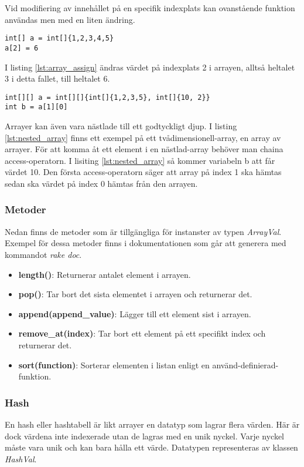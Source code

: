 \documentclass{TDP003mall}
\begin{document}
Vid modifiering av innehållet på en specifik indexplats kan ovanstående funktion användas men med en liten ändring.
\begin{lstlisting}[caption=Ändra värden i en array, label=lst:array_assign]
int[] a = int[]{1,2,3,4,5}
a[2] = 6
\end{lstlisting}
I listing \ref{lst:array_assign} ändras värdet på indexplats 2 i arrayen, alltså heltalet 3 i detta fallet, till heltalet 6.

\begin{lstlisting}[caption=Nästlad-array, label=lst:nested_array]
int[][] a = int[][]{int[]{1,2,3,5}, int[]{10, 2}}
int b = a[1][0]
\end{lstlisting}
Arrayer kan även vara nästlade till ett godtyckligt djup. I listing \ref{lst:nested_array} finns ett exempel på ett tvådimensionell-array, en array av arrayer.
För att komma åt ett element i en nästlad-array behöver man chaina access-operatorn. 
I lisiting \ref{lst:nested_array} så kommer variabeln b att får värdet 10.
Den första access-operatorn säger att array på index 1 ska hämtas sedan ska värdet på index 0 hämtas från den arrayen.

\subsubsection*{Metoder}
Nedan finns de metoder som är tillgängliga för instanster av typen \emph{ArrayVal}.
Exempel för dessa metoder finns i dokumentationen som går att generera med kommandot \emph{rake doc}.

\begin{itemize}
    \item \textbf{length()}: Returnerar antalet element i arrayen.
    \item \textbf{pop()}: Tar bort det sista elementet i arrayen och returnerar det.
    \item \textbf{append(append\_value)}: Lägger till ett element sist i arrayen.
    \item \textbf{remove\_at(index)}: Tar bort ett element på ett specifikt index och returnerar det.
    \item \textbf{sort(function)}: Sorterar elementen i listan enligt en använd-definierad-funktion.
\end{itemize}

\subsubsection{Hash}
En hash eller hashtabell är likt arrayer en datatyp som lagrar flera värden. Här är dock värdena inte indexerade utan de lagras med en unik nyckel. Varje nyckel måste vara unik och kan bara hålla ett värde.
Datatypen representeras av klassen \emph{HashVal}.
\end{document}
